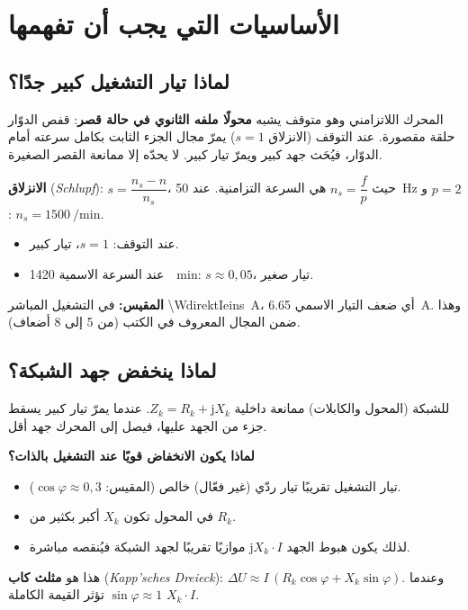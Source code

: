 \documentclass[11pt,a4paper]{article}
\newcommand{\de}[1]{(\textgerman{\itshape #1})}
\begin{document}
\section{الأساسيات التي يجب أن تفهمها}
\subsection{لماذا تيار التشغيل كبير جدًا؟}
المحرك اللاتزامني وهو متوقف يشبه \textbf{محولًا ملفه الثانوي في حالة قصر}:
قفص الدوّار حلقة مقصورة. عند التوقف (الانزلاق $s=1$) يمرّ مجال الجزء الثابت بكامل سرعته أمام الدوّار،
فيُحَث جهد كبير ويمرّ تيار كبير. لا يحدّه إلا ممانعة القصر الصغيرة.

\textbf{الانزلاق} \de{Schlupf}: $s = \dfrac{n_s - n}{n_s}$، حيث $n_s = \dfrac{f}{p}$ هي السرعة التزامنية.
عند \SI{50}{Hz} و $p=2$: $n_s = \SI{1500}{\per\minute}$.
\begin{itemize}
\item عند التوقف: $s=1$، تيار كبير.
\item عند السرعة الاسمية \SI{1420}{\per\minute}: $s\approx 0{,}05$، تيار صغير.
\end{itemize}
\textbf{المقيس:} في التشغيل المباشر \SI{\WdirektIeins}{A}، أي \WdirektIN{} ضعف التيار الاسمي
\SI{6,65}{A}. وهذا ضمن المجال المعروف في الكتب (من 5 إلى 8 أضعاف).

\subsection{لماذا ينخفض جهد الشبكة؟}
للشبكة (المحول والكابلات) ممانعة داخلية $Z_k = R_k + \mathrm jX_k$.
عندما يمرّ تيار كبير يسقط جزء من الجهد عليها، فيصل إلى المحرك جهد أقل.

\textbf{لماذا يكون الانخفاض قويًا عند التشغيل بالذات؟}
\begin{itemize}
\item تيار التشغيل تقريبًا تيار ردّي (غير فعّال) خالص (المقيس: $\cos\varphi\approx0{,}3$).
\item في المحول تكون $X_k$ أكبر بكثير من $R_k$.
\item لذلك يكون هبوط الجهد $\mathrm jX_k\cdot I$ موازيًا تقريبًا لجهد الشبكة فيُنقصه مباشرة.
\end{itemize}
هذا هو \textbf{مثلث كاب} \de{Kapp'sches Dreieck}:
$\Delta U \approx I\,(R_k\cos\varphi + X_k\sin\varphi)$.
وعندما $\sin\varphi\approx1$ تؤثر القيمة الكاملة $X_k\cdot I$.
\end{document}
